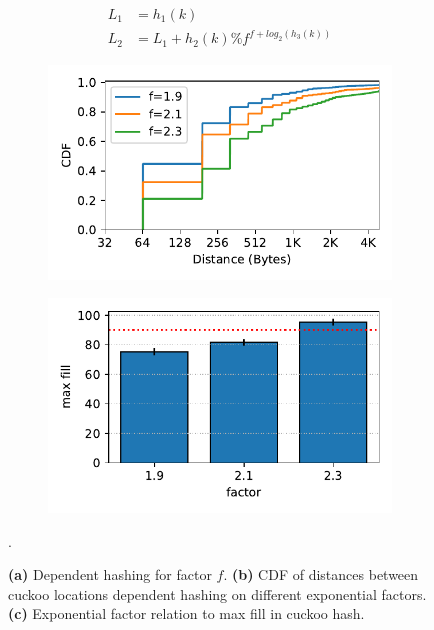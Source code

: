 \begin{figure}[t]
    \centering
    \begin{subfigure}{0.3\linewidth}
        \begin{align*}
            L_1 &= h_1(k) \\
            L_2 &= L_1 + h_2(k) \% f^{f + log_2(h_3(k))}
        \end{align*}
    \end{subfigure}
    \begin{subfigure}{0.3\linewidth}
        \includegraphics[width=0.99\linewidth]{fig/hash_factor.pdf}
    \end{subfigure}
    \begin{subfigure}{0.3\linewidth}
        \includegraphics[width=0.99\linewidth]{fig/hash_fill.pdf}
    \end{subfigure}.
    \vspace{-1em}
    \caption{
    \textbf{(a)} Dependent hashing for factor $f$.
    \textbf{(b)} CDF of distances between cuckoo locations dependent hashing on different exponential factors.
    \textbf{(c)} Exponential factor relation to max fill in cuckoo hash.
    }
    \label{fig:locality-hashing}

\end{figure}


